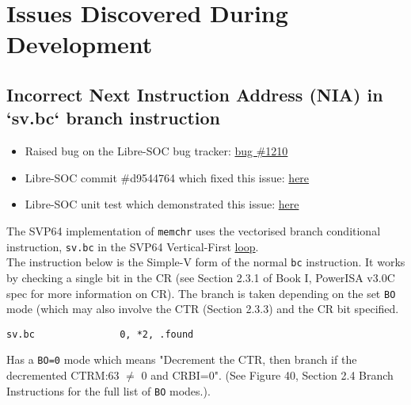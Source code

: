%

\chapter{Issues Discovered During Development}

\section{Incorrect Next Instruction Address (NIA) in `sv.bc` branch instruction}

\begin{itemize}
  \item Raised bug on the Libre-SOC bug tracker:
  \href{https://bugs.libre-soc.org/show_bug.cgi?id=1210}{bug \#1210}
  \item Libre-SOC commit \#d9544764 which fixed this issue:
  \href{https://git.libre-soc.org/?p=openpower-isa.git;a=commitdiff;h=d9544764b1710f3807a9c0685d150a665f70b9a2}{here}
  \item Libre-SOC unit test which demonstrated this issue:
  \href{https://git.libre-soc.org/?p=openpower-isa.git;a=blob;f=src/openpower/decoder/isa/test_caller_svp64_bc.py;h=93689ded619f8fa67b455f18b122fa60220ddea1;hb=089e6d352ec57be4ab645d18ad9e95df3af0d365#l310}{here}
\end{itemize}

The \acrshort{SVP64} implementation of \texttt{memchr} uses the vectorised branch
conditional instruction, \texttt{sv.bc} in the \acrshort{SVP64} Vertical-First
\href{https://github.com/ngisearchsvp64/glibc-svp64/blob/1afb94889b8ea2f85844e410f87e5a9b8e2e959f/svp64-port/svp64/memchr_svp64.s#L67}{loop}.\\

The instruction below is the Simple-V form of the normal \texttt{bc} instruction.
It works by checking a single bit in the \acrfull{CR}
(see Section 2.3.1 of Book I, PowerISA v3.0C spec for more information
on \acrshort{CR}).
The branch is taken depending on the set \texttt{BO} mode (which may also
involve the \acrfull{CTR} (Section 2.3.3) and the CR bit specified.

\begin{verbatim}
sv.bc               0, *2, .found
\end{verbatim}

Has a \texttt{BO=0} mode which means "Decrement the CTR, then branch
if the decremented CTRM:63 $\neq$ 0 and CRBI=0". (See Figure 40, Section 2.4
Branch Instructions for the full list of \texttt{BO} modes.).\\

